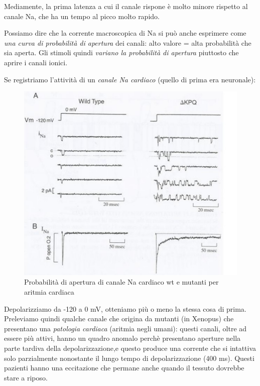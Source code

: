 \documentclass[a4paper,12pt]{article}
\begin{document}
Mediamente, la prima latenza a cui il canale rispone è molto minore rispetto al canale Na, che ha un tempo al picco molto rapido.

Possiamo dire che la corrente macroscopica di Na si può anche esprimere come \emph{una curva di probabilità di apertura} dei canali: alto valore = alta probabilità che sia aperta. Gli stimoli quindi \emph{variano la probabilità di apertura} piuttosto che aprire i canali ionici.

Se registriamo l'attività di un \emph{canale Na cardiaco} (quello di prima era neuronale): 

\begin{figure}[H]
\centering
\includegraphics[scale=0.4]{immagine/na_cuore.jpg}
\caption{Probabilità di apertura di canale Na cardiaco wt e mutanti per aritmia cardiaca}
\end{figure} 

Depolarizziamo da -120 a 0 mV, otteniamo più o meno la stessa cosa di prima. Preleviamo quindi qualche canale che origina da mutanti (in Xenopus) che presentano una \emph{patologia cardiaca} (aritmia negli umani): questi canali, oltre ad essere più attivi, hanno un quadro anomalo perchè presentano aperture nella parte tardiva della depolarizzazione,e questo produce una corrente che si intattiva solo parzialmente nonostante il lungo tempo di depolarizzazione (400 ms). Questi pazienti hanno una eccitazione che permane anche quando il tessuto dovrebbe stare a riposo.
\end{document}
